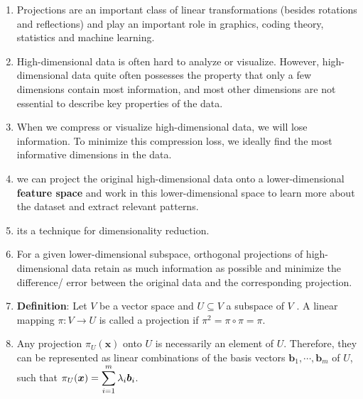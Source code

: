 \begin{enumerate}
    \item Projections are an important class of linear transformations (besides rotations and reflections) and play an important role in graphics, coding theory, statistics and machine learning.
    \hfill \cite{mfml/book/mml/Deisenroth-Faisal-Ong}

    \item High-dimensional data is often hard to analyze or visualize. 
    However, high-dimensional data quite often possesses the property that only a few dimensions contain most information, and most other dimensions are not essential to describe key properties of the data. 
    \hfill \cite{mfml/book/mml/Deisenroth-Faisal-Ong}

    \item When we compress or visualize high-dimensional data, we will lose information. To minimize this compression loss, we ideally find the most informative dimensions in the data.
    \hfill \cite{mfml/book/mml/Deisenroth-Faisal-Ong}

    \item we can project the original high-dimensional data onto a lower-dimensional \textbf{feature space} and work in this lower-dimensional space to learn more about the dataset and extract relevant patterns.
    \hfill \cite{mfml/book/mml/Deisenroth-Faisal-Ong}

    \item its a technique for dimensionality reduction.
    \hfill \cite{mfml/book/mml/Deisenroth-Faisal-Ong}

    \item For a given lower-dimensional subspace, orthogonal projections of high-dimensional data retain as much information as possible and minimize the difference/ error between the original data and the corresponding projection.
    \hfill \cite{mfml/book/mml/Deisenroth-Faisal-Ong}

    \item \textbf{Definition}: Let $V$ be a vector space and $U \subseteq V$ a subspace of $V$ . 
    A linear mapping $\pi : V \to U$ is called a projection if $\pi^2 = \pi \circ \pi = \pi$.
    \hfill \cite{mfml/book/mml/Deisenroth-Faisal-Ong}

    \item Any projection $\pi_U (\bm{x})$ onto $U$ is necessarily an element of $U$.
    Therefore, they can be represented as linear combinations of the basis vectors $\bm{b}_1, \cdots , \bm{b}_m$ of $U$, such that $\pi_U (\bm{x}) = \displaystyle\sum ^m _{i=1} \lambda_i \bm{b}_i$.
    \hfill \cite{mfml/book/mml/Deisenroth-Faisal-Ong}


\end{enumerate}
